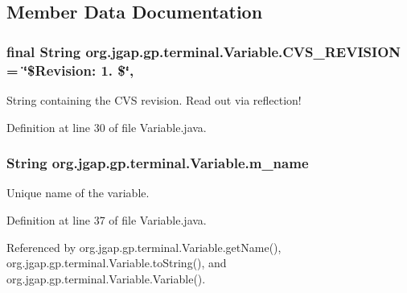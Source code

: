 \subsection{Member Data Documentation}
\hypertarget{classorg_1_1jgap_1_1gp_1_1terminal_1_1_variable_adb38a50039f85ec2dfc3ffae9cb8c50b}{
\subsubsection[{C\-V\-S\-\_\-\-R\-E\-V\-I\-S\-I\-O\-N}]{\setlength{\rightskip}{0pt plus 5cm}final String org.\-jgap.\-gp.\-terminal.\-Variable.\-C\-V\-S\-\_\-\-R\-E\-V\-I\-S\-I\-O\-N = \char`\"{}\$Revision\-: 1. \$\char`\"{}\hspace{0.3cm}{\ttfamily [static]}, {\ttfamily [private]}}}\label{classorg_1_1jgap_1_1gp_1_1terminal_1_1_variable_adb38a50039f85ec2dfc3ffae9cb8c50b}
String containing the C\-V\-S revision. Read out via reflection! 

Definition at line 30 of file Variable.\-java.

\hypertarget{classorg_1_1jgap_1_1gp_1_1terminal_1_1_variable_a9819f32565614b3b60997fbba51374f9}{
\subsubsection[{m\-\_\-name}]{\setlength{\rightskip}{0pt plus 5cm}String org.\-jgap.\-gp.\-terminal.\-Variable.\-m\-\_\-name\hspace{0.3cm}{\ttfamily [private]}}}\label{classorg_1_1jgap_1_1gp_1_1terminal_1_1_variable_a9819f32565614b3b60997fbba51374f9}
Unique name of the variable. 

Definition at line 37 of file Variable.\-java.



Referenced by org.\-jgap.\-gp.\-terminal.\-Variable.\-get\-Name(), org.\-jgap.\-gp.\-terminal.\-Variable.\-to\-String(), and org.\-jgap.\-gp.\-terminal.\-Variable.\-Variable().

